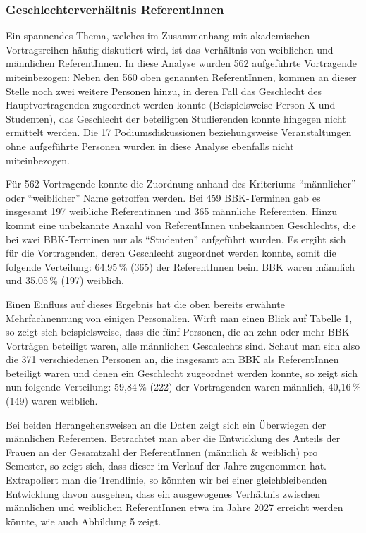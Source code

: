 \documentclass[a4paper,
fontsize=11pt,
oneside,
numbers=noperiodatend,
parskip=half-,
bibliography=totoc,
final
]{scrartcl}
\begin{document}
\hypertarget{geschlechterverhuxe4ltnis-referentinnen}{%
\subsubsection{Geschlechterverhältnis
ReferentInnen}\label{geschlechterverhuxe4ltnis-referentinnen}}

Ein spannendes Thema, welches im Zusammenhang mit akademischen
Vortragsreihen häufig diskutiert wird, ist das Verhältnis von weiblichen
und männlichen ReferentInnen. In diese Analyse wurden 562 aufgeführte
Vortragende miteinbezogen: Neben den 560 oben genannten ReferentInnen,
kommen an dieser Stelle noch zwei weitere Personen hinzu, in deren Fall
das Geschlecht des Hauptvortragenden zugeordnet werden konnte
(Beispielsweise Person X und Studenten), das Geschlecht der beteiligten
Studierenden konnte hingegen nicht ermittelt werden. Die 17
Podiumsdiskussionen beziehungsweise Veranstaltungen ohne aufgeführte
Personen wurden in diese Analyse ebenfalls nicht miteinbezogen.

Für 562 Vortragende konnte die Zuordnung anhand des Kriteriums
\enquote{männlicher} oder \enquote{weiblicher} Name getroffen werden.
Bei 459 BBK-Terminen gab es insgesamt 197 weibliche Referentinnen und
365 männliche Referenten. Hinzu kommt eine unbekannte Anzahl von
ReferentInnen unbekannten Geschlechts, die bei zwei BBK-Terminen nur als
\enquote{Studenten} aufgeführt wurden. Es ergibt sich für die
Vortragenden, deren Geschlecht zugeordnet werden konnte, somit die
folgende Verteilung: 64,95\,\% (365) der ReferentInnen beim BBK waren
männlich und 35,05\,\% (197) weiblich.

Einen Einfluss auf dieses Ergebnis hat die oben bereits erwähnte
Mehrfachnennung von einigen Personalien. Wirft man einen Blick auf
Tabelle 1, so zeigt sich beispielsweise, dass die fünf Personen, die an
zehn oder mehr BBK-Vorträgen beteiligt waren, alle männlichen
Geschlechts sind. Schaut man sich also die 371 verschiedenen Personen
an, die insgesamt am BBK als ReferentInnen beteiligt waren und denen ein
Geschlecht zugeordnet werden konnte, so zeigt sich nun folgende
Verteilung: 59,84\,\% (222) der Vortragenden waren männlich, 40,16\,\%
(149) waren weiblich.

Bei beiden Herangehensweisen an die Daten zeigt sich ein Überwiegen der
männlichen Referenten. Betrachtet man aber die Entwicklung des Anteils
der Frauen an der Gesamtzahl der ReferentInnen (männlich \& weiblich)
pro Semester, so zeigt sich, dass dieser im Verlauf der Jahre zugenommen
hat. Extrapoliert man die Trendlinie, so könnten wir bei einer
gleichbleibenden Entwicklung davon ausgehen, dass ein ausgewogenes
Verhältnis zwischen männlichen und weiblichen ReferentInnen etwa im
Jahre 2027 erreicht werden könnte, wie auch Abbildung 5 zeigt.
\end{document}

